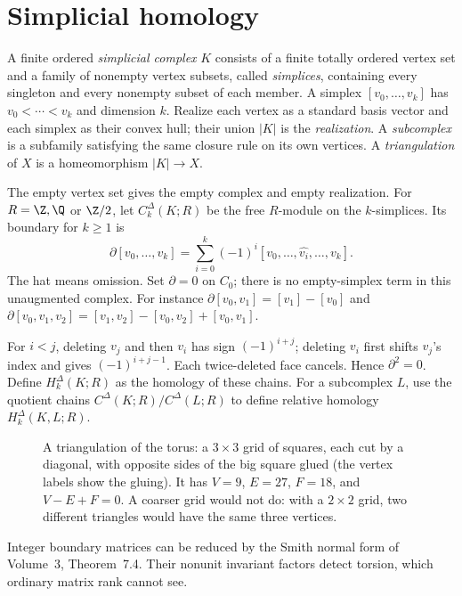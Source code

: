 \section{Simplicial homology}

\begin{definition}
A finite ordered \emph{simplicial complex} $K$ consists of a finite totally ordered vertex set and a family of nonempty vertex subsets, called \emph{simplices}, containing every singleton and every nonempty subset of each member. A simplex $[v_0,\ldots,v_k]$ has $v_0<\cdots<v_k$ and dimension $k$. Realize each vertex as a standard basis vector and each simplex as their convex hull; their union $|K|$ is the \emph{realization}. A \emph{subcomplex} is a subfamily satisfying the same closure rule on its own vertices. A \emph{triangulation} of $X$ is a homeomorphism $|K|\to X$.
\end{definition}

The empty vertex set gives the empty complex and empty realization. For $R=\Z,\Q$ or $\Z/2$, let $C_k^\Delta(K;R)$ be the free $R$-module on the $k$-simplices. Its boundary for $k\ge1$ is
\[
\partial[v_0,\ldots,v_k]=\sum_{i=0}^k(-1)^i[v_0,\ldots,\widehat{v_i},\ldots,v_k].
\]
The hat means omission. Set $\partial=0$ on $C_0$; there is no empty-simplex term in this unaugmented complex. For instance $\partial[v_0,v_1]=[v_1]-[v_0]$ and $\partial[v_0,v_1,v_2]=[v_1,v_2]-[v_0,v_2]+[v_0,v_1]$.

For $i<j$, deleting $v_j$ and then $v_i$ has sign $(-1)^{i+j}$; deleting $v_i$ first shifts $v_j$'s index and gives $(-1)^{i+j-1}$. Each twice-deleted face cancels. Hence $\partial^2=0$. Define $H_k^\Delta(K;R)$ as the homology of these chains. For a subcomplex $L$, use the quotient chains $C^\Delta(K;R)/C^\Delta(L;R)$ to define relative homology $H_k^\Delta(K,L;R)$.

\begin{figure}[ht]
\centering
{}
\caption{A triangulation of the torus: a $3\times3$ grid of squares, each cut by a diagonal, with opposite sides of the big square glued (the vertex labels show the
gluing). It has $V=9$, $E=27$, $F=18$, and $V-E+F=0$. A coarser grid would not do: with a $2\times2$ grid, two different triangles would have the same three vertices.}
\label{fig:torustriang}
\end{figure}

Integer boundary matrices can be reduced by the Smith normal form of Volume~3, Theorem~7.4. Their nonunit invariant factors detect torsion, which ordinary matrix rank cannot see.

